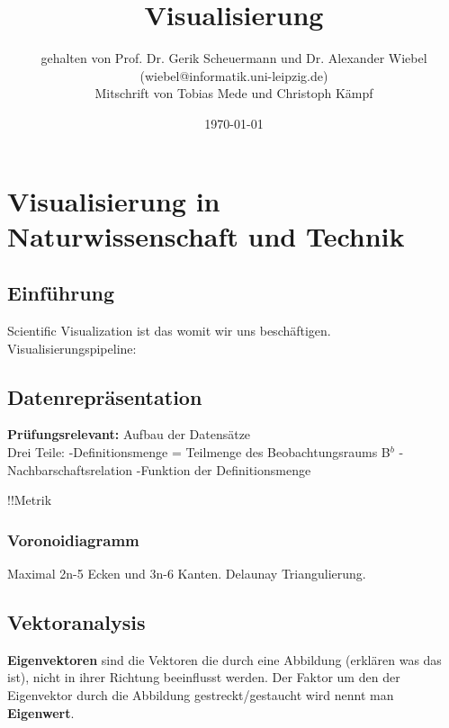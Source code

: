 \documentclass[12pt,a4paper,oneside,normalheadings,abstracton,liststotoc,bibtotoc,titlepage,pdftex]{scrbook}
\begin{document}

\titlehead{Universität Leipzig\\Fakultät für Fakultät für Mathematik und Informatik}
\subject{Vorlesungsmitschrift WiSe 2010}
\title{Visualisierung}
\author{gehalten von Prof. Dr. Gerik Scheuermann und Dr. Alexander Wiebel (wiebel@informatik.uni-leipzig.de)\\
Mitschrift von Tobias Mede und Christoph Kämpf}
\date{\today}

\maketitle[1]


\tableofcontents
\pagebreak


\chapter{Visualisierung in Naturwissenschaft und Technik}

\section{Einführung}
Scientific Visualization ist das womit wir uns beschäftigen.
Visualisierungspipeline:


\section{Datenrepräsentation}
\textbf{Prüfungsrelevant:} Aufbau der Datensätze\\


Drei Teile:
-Definitionsmenge = Teilmenge des Beobachtungsraums B$^b$
-Nachbarschaftsrelation
-Funktion der Definitionsmenge

!!Metrik
\subsection{Voronoidiagramm}
Maximal 2n-5 Ecken und 3n-6 Kanten. Delaunay Triangulierung.

\section{Vektoranalysis}
\textbf{Eigenvektoren} sind die Vektoren die durch eine Abbildung (erklären was das ist), nicht in ihrer Richtung beeinflusst werden. Der Faktor um den der Eigenvektor durch die Abbildung gestreckt/gestaucht wird nennt man \textbf{Eigenwert}.
\end{document}
